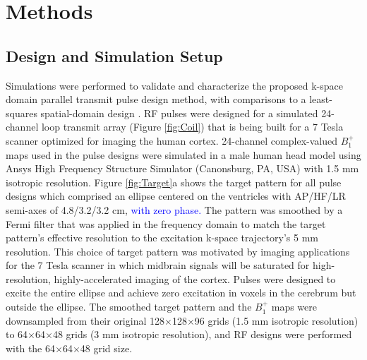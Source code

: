 \section*{Methods}
\subsection*{Design and Simulation Setup}
Simulations were performed to validate and characterize the proposed k-space domain parallel transmit pulse design method,
with comparisons to a least-squares spatial-domain design \cite{Grissom:2006:MRM}.
RF pulses were designed for a simulated 24-channel loop transmit array (Figure \ref{fig:Coil}) that is being built for a 7 Tesla scanner optimized
for imaging the human cortex.  
24-channel complex-valued $B_1^+$ maps used in the pulse designs were simulated in a male human head model using 
Ansys High Frequency Structure Simulator (Canonsburg, PA, USA) with 1.5 mm isotropic resolution. 
Figure \ref{fig:Target}a shows the target pattern for all pulse designs which comprised an ellipse centered on the ventricles with AP/HF/LR semi-axes of 4.8/3.2/3.2 cm,
\textcolor{blue}{with zero phase.} 
The pattern was smoothed by a Fermi filter that was applied in the frequency domain to match the target pattern's effective resolution to the excitation k-space trajectory's 5 mm resolution.
This choice of target pattern was motivated by imaging applications for the 7 Tesla scanner 
in which midbrain signals will be saturated for high-resolution, highly-accelerated imaging of the cortex. 
Pulses were designed to excite the entire ellipse and achieve zero excitation in voxels in the cerebrum but outside the ellipse. 
The smoothed target pattern and the $B_1^+$ maps were downsampled from their original 128$\times$128$\times$96 grids (1.5 mm isotropic resolution) to 
64$\times$64$\times$48 grids (3 mm isotropic resolution),
and RF designs were performed with the 64$\times$64$\times$48 grid size. 




